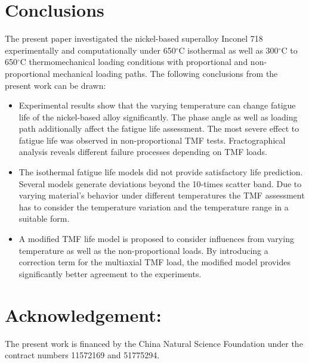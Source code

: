 \documentclass[preprint,5p,twocolumn,11pt,sort&compress]{elsarticle}
\begin{document}
\section{Conclusions}

The present paper investigated the nickel-based superalloy Inconel 718  experimentally and computationally under 650$^\circ$C isothermal as well as 300$^\circ$C to 650$^\circ$C thermomechanical loading conditions with proportional and non-proportional mechanical loading paths. The following conclusions from the present work can be drawn:

\begin{itemize}
\item Experimental results show that the varying temperature can change fatigue life of the nickel-based alloy significantly. The phase angle as well as loading path additionally affect the fatigue life assessment. The most severe effect to fatigue life was observed in non-proportional TMF tests. Fractographical analysis reveals different failure processes depending on TMF loads.

\item The isothermal fatigue life models did not provide satisfactory life prediction. Several models generate deviations beyond the 10-times scatter band. Due to varying material's behavior under different temperatures the TMF assessment has to consider the temperature variation and the temperature range in a suitable form.

\item A modified TMF life model is proposed to consider influences from varying temperature as well as the non-proportional loads. By introducing a correction term for the multiaxial TMF load, the modified model provides significantly better agreement to the experiments.


\end{itemize}


\section*{Acknowledgement:} The present work is financed by the China Natural Science Foundation under the contract numbers 11572169 and 51775294.

\end{document}
